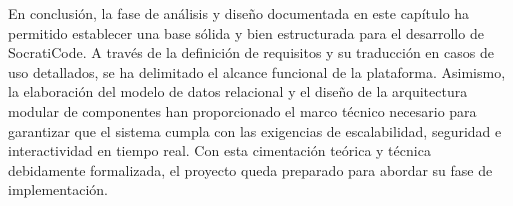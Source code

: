 En conclusión, la fase de análisis y diseño documentada en este capítulo ha permitido establecer una base sólida y bien estructurada para el desarrollo de SocratiCode. A través de la definición de requisitos y su traducción en casos de uso detallados, se ha delimitado el alcance funcional de la plataforma. Asimismo, la elaboración del modelo de datos relacional y el diseño de la arquitectura modular de componentes han proporcionado el marco técnico necesario para garantizar que el sistema cumpla con las exigencias de escalabilidad, seguridad e interactividad en tiempo real. Con esta cimentación teórica y técnica debidamente formalizada, el proyecto queda preparado para abordar su fase de implementación.
